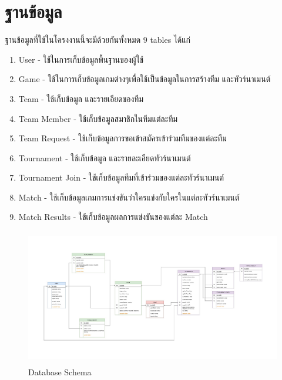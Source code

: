\section{ฐานข้อมูล}
ฐานข้อมูลที่ใช้ในโครงงานนี้จะมีด้วยกันทั้งหมด 9 tables ได้แก่
\begin{enumerate}
  \item User - ใช้ในการเก็บข้อมูลพื้นฐานของผู้ใช้
  \item Game - ใช้ในการเก็บข้อมูลเกมต่างๆเพื่อใช้เป็นข้อมูลในการสร้างทีม และทัวร์นาเมนต์
  \item Team - ใช้เก็บข้อมูล และรายเอียดของทีม
  \item Team Member - ใช้เก็บข้อมูลสมาชิกในทีมแต่ละทีม
  \item Team Request -  ใช้เก็บข้อมูลการขอเข้าสมัครเข้าร่วมทีมของแต่ละทีม
  \item Tournament - ใช้เก็บข้อมูล และรายละเอียดทัวร์นาเมนต์
  \item Tournament Join - ใช้เก็บข้อมูลทีมที่เข้าร่วมของแต่ละทัวร์นาเมนต์
  \item Match - ใช้เก็บข้อมูลเกมการแข่งขันว่าใครแข่งกับใครในแต่ละทัวร์นาเมนต์
  \item Match Results - ใช้เก็บข้อมูลผลการแข่งขันของแต่ละ Match
\end{enumerate}
\begin{figure}[h]
  \begin{center}
  \includegraphics[width=18cm,height=6cm,keepaspectratio]{492_FyTy Tournament.png}
  \end{center}
  \caption[Database Schema]{Database Schema}
  \label{fig:Database Schema}
\end{figure}

\pagebreak

